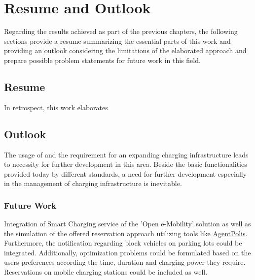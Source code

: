

\chapter{Resume and Outlook}
\label{ch:Resume and Outlook}

Regarding the results achieved as part of the previous chapters, the following sections provide a resume summarizing the essential parts of this work and providing an outlook considering the limitations of the elaborated approach and prepare possible problem statements for future work in this field.

\section{Resume}
\label{ch:Resume and Outlook:sec:Resume}

In retrospect, this work elaborates

\section{Outlook}
\label{ch:Resume and Outlook:sec:Outlook}

The usage of  and the requirement for an expanding charging infrastructure leads to necessity for further development in this area. Beside the basic functionalities provided today by different standards, a need for further development especially in the management of charging infrastructure is inevitable. 

\subsection{Future Work}
\label{ch:Resume and Outlook:sec:Outlook:ssec:Future Work}

Integration of Smart Charging service of the 'Open e-Mobility' solution as well as the simulation of the offered reservation approach utilizing tools like \href{https://github.com/aicenter/agentpolis}{AgentPolis}.
Furthermore, the notification regarding block vehicles on  parking lots could be integrated.
Additionally, optimization problems could be formulated based on the users preferences according the time, duration and charging power they require.
Reservations on mobile charging stations could be included as well.